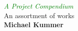 \documentclass[../r.tex]{subfiles}
\begin{document}
\begin{titlepage} 

	\centering 
	\textcolor{Green}{\textit{\Huge A Project Compendium}}\\[\baselineskip]
	{\color{RosyBrown}\Large An assortment of works}\\
	\vfill 
	{\Large\textbf{Michael Kummer}}\\
	\vfill 
\end{titlepage}
\end{document}

